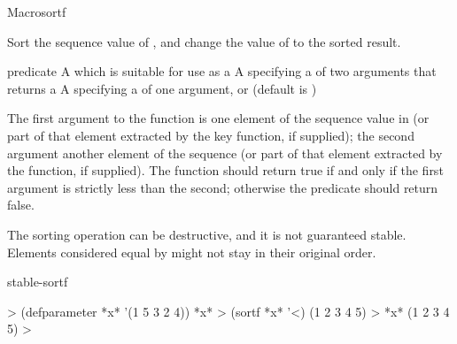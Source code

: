 \documentclass[10pt,twoside,english,pdftex]{article}
\begin{document}
\begin{functiondoc}{Macro}{sortf}{
    }
%

\fnsyntax

\fnpurpose Sort the sequence value of , and change the value of
 to the sorted result.

\fnpackage {}

\fnmodule {}

\fnargs
\begin{args}{predicate}
\arg[place] A  which is suitable for use as a
\arg[predicate] A  specifying a
   of two arguments that returns a
\arg[key] A  specifying a 
  of one argument, or \nil{} (default is \nil)
\end{args}

\fndescription
%
The first argument to the  function is one element of the
sequence value in  (or part of that element extracted by the key
function, if supplied); the second argument another element of the sequence
(or part of that element extracted by the  function, if
supplied). The  function should return true if and only if
the first argument is strictly less than the second; otherwise the predicate
should return false.

The sorting operation can be destructive, and it is not guaranteed
stable. Elements considered equal by  might not stay in their
original order.

\begin{alsos}{stable-sortf}
\end{alsos}

\fnexample
\begin{example}
%
\W\supp
  > (defparameter *x* '(1 5 3 2 4))
  *x*
  > (sortf *x* '<)
  (1 2 3 4 5)
  > *x*
  (1 2 3 4 5)
  >
\end{example}

\end{functiondoc}

\end{document}

